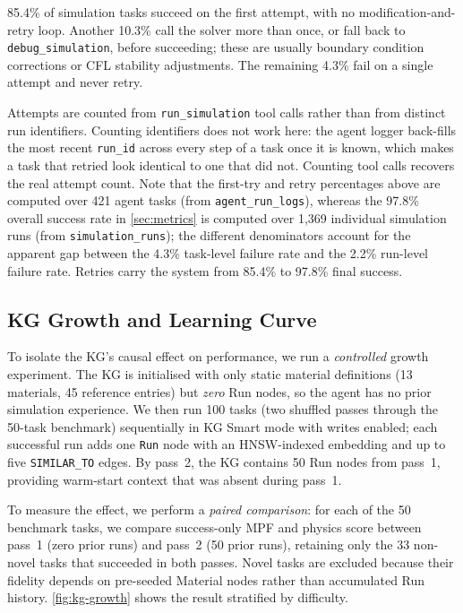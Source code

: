 \documentclass[twocolumn]{article}
\newif\ifrevisionsvisible
\newcommand{\revised}[1]{%
  \ifrevisionsvisible\textcolor{revisionred}{#1}\else#1\fi}
\begin{document}
\revised{85.4\% of simulation tasks succeed on the first attempt, with no
modification-and-retry loop.  Another 10.3\% call the solver more than
once, or fall back to \texttt{debug\_simulation}, before succeeding;
these are usually boundary condition corrections or CFL stability
adjustments.  The remaining 4.3\% fail on a single attempt and never
retry.}

\revised{Attempts are counted from \texttt{run\_simulation} tool calls rather
than from distinct run identifiers.  Counting identifiers does not work
here: the agent logger back-fills the most recent \texttt{run\_id} across
every step of a task once it is known, which makes a task that retried
look identical to one that did not.  Counting tool calls recovers the
real attempt count.  Note that the first-try and retry percentages above
are computed over 421 agent tasks (from \texttt{agent\_run\_logs}),
whereas the 97.8\% overall success rate in \cref{sec:metrics} is
computed over 1{,}369 individual simulation runs (from
\texttt{simulation\_runs}); the different denominators account for the
apparent gap between the 4.3\% task-level failure rate and the 2.2\%
run-level failure rate.  Retries carry the
system from 85.4\% to 97.8\% final success.}

\subsection{KG Growth and Learning Curve}
\label{sec:kg-growth}

To isolate the KG's causal effect on performance, we run a
\emph{controlled} growth experiment.  The KG is initialised with only
static material definitions (13 materials, 45 reference entries) but
\emph{zero} Run nodes, so the agent has no prior simulation experience.
We then run 100 tasks (two shuffled passes through the 50-task
benchmark) sequentially in KG Smart mode with writes enabled; each
successful run adds one \texttt{Run} node with an HNSW-indexed
embedding and up to five \texttt{SIMILAR\_TO} edges.  By pass~2, the
KG contains 50 Run nodes from pass~1, providing warm-start context
that was absent during pass~1.

To measure the effect, we perform a \emph{paired comparison}: for
each of the 50 benchmark tasks, we compare success-only MPF and
physics score between pass~1 (zero prior runs) and pass~2 (50 prior
runs), retaining only the 33 non-novel tasks that succeeded in both
passes.  Novel tasks are excluded because their fidelity depends on
pre-seeded Material nodes rather than accumulated Run history.
\cref{fig:kg-growth} shows the result stratified by difficulty.
\end{document}
